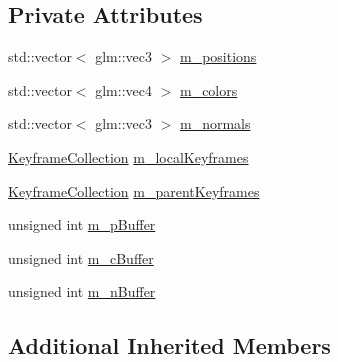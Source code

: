 \subsection*{Private Attributes}
\begin{DoxyCompactItemize}
\item 
std\+::vector$<$ glm\+::vec3 $>$ \hyperlink{classKeyframedCylinderRenderable_a6429ca81b8b337a5b2fdbf25e5a232d2}{m\+\_\+positions}
\item 
std\+::vector$<$ glm\+::vec4 $>$ \hyperlink{classKeyframedCylinderRenderable_a7e70c2f1e07d14372589ef88f16e7bcd}{m\+\_\+colors}
\item 
std\+::vector$<$ glm\+::vec3 $>$ \hyperlink{classKeyframedCylinderRenderable_a4d306f63513ee46874d65078fb041a52}{m\+\_\+normals}
\item 
\hyperlink{classKeyframeCollection}{Keyframe\+Collection} \hyperlink{classKeyframedCylinderRenderable_a8d821f7953d26700d2eb49ca4b66cc18}{m\+\_\+local\+Keyframes}
\item 
\hyperlink{classKeyframeCollection}{Keyframe\+Collection} \hyperlink{classKeyframedCylinderRenderable_afcb8c6b8048454621f6375a1eebb2ca1}{m\+\_\+parent\+Keyframes}
\item 
unsigned int \hyperlink{classKeyframedCylinderRenderable_ae72ab893df021692d8c4e4d8e7081931}{m\+\_\+p\+Buffer}
\item 
unsigned int \hyperlink{classKeyframedCylinderRenderable_afdf432acba934c57255874373f234875}{m\+\_\+c\+Buffer}
\item 
unsigned int \hyperlink{classKeyframedCylinderRenderable_a73db5a6ed8d7452244834ef396cb0279}{m\+\_\+n\+Buffer}
\end{DoxyCompactItemize}
\subsection*{Additional Inherited Members}


